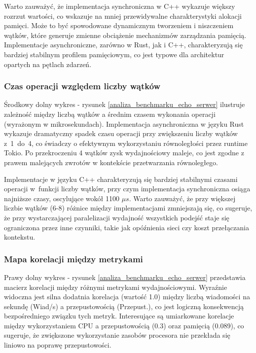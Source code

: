 Warto zauważyć, że implementacja synchroniczna w C++ wykazuje większy rozrzut wartości, co wskazuje na mniej przewidywalne charakterystyki alokacji pamięci. Może to być spowodowane dynamicznym tworzeniem i niszczeniem wątków, które generuje zmienne obciążenie mechanizmów zarządzania pamięcią. Implementacje asynchroniczne, zarówno w Rust, jak i C++, charakteryzują się bardziej stabilnym profilem pamięciowym, co jest typowe dla architektur opartych na pętlach zdarzeń.

\subsubsection{Czas operacji względem liczby wątków}
Środkowy dolny wykres - rysunek \ref{analiza_benchmarku_echo_serwer} ilustruje zależność między liczbą wątków a średnim czasem wykonania operacji (wyrażonym w mikrosekundach). Implementacja asynchroniczna w języku Rust wykazuje dramatyczny spadek czasu operacji przy zwiększeniu liczby wątków z~\mbox{1 do 4}, co świadczy o efektywnym wykorzystaniu równoległości przez runtime Tokio. Po przekroczeniu 4 wątków zysk wydajnościowy maleje, co jest zgodne z prawem malejących zwrotów w kontekście przetwarzania równoległego.

Implementacje w języku C++ charakteryzują się bardziej stabilnymi czasami operacji w~funkcji liczby wątków, przy czym implementacja synchroniczna osiąga najniższe czasy, oscylujące wokół 1100 $\mu s$. Warto zauważyć, że przy większej liczbie wątków (6-8) różnice między implementacjami zmniejszają się, co sugeruje, że przy wystarczającej paralelizacji wydajność wszystkich podejść staje się ograniczona przez inne czynniki, takie jak opóźnienia sieci czy koszt przełączania kontekstu.

\subsubsection{Mapa korelacji między metrykami}
Prawy dolny wykres - rysunek \ref{analiza_benchmarku_echo_serwer} przedstawia macierz korelacji między różnymi metrykami wydajnościowymi. Wyraźnie widoczna jest silna dodatnia korelacja (wartość 1.0) między liczbą wiadomości na sekundę (Wiad/s) a przepustowością (Przepust.), co jest logiczną konsekwencją bezpośredniego związku tych metryk. Interesujące są umiarkowane korelacje między wykorzystaniem CPU a przepustowością (0.3) oraz pamięcią (0.089), co sugeruje, że zwiększone wykorzystanie zasobów procesora nie przekłada się liniowo na poprawę przepustowości.

